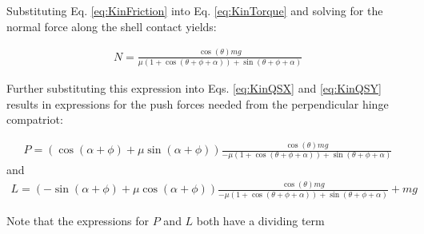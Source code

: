 \documentclass[letterpaper]{report}
\begin{document}
Substituting Eq. \ref{eq:KinFriction} into Eq. \ref{eq:KinTorque} and solving for the normal force along the shell contact yields:

\begin{align}
N = \frac{\cos(\theta) m g}{\mu (1+\cos(\theta + \phi + \alpha)) + \sin(\theta + \phi + \alpha)}
\end{align}

Further substituting this expression into Eqs. \ref{eq:KinQSX} and \ref{eq:KinQSY} results in expressions for the push forces needed from the perpendicular hinge compatriot:

\begin{align}
P = ( \cos(\alpha+\phi) + \mu \sin(\alpha+\phi) ) \frac{\cos(\theta) m g}{-\mu (1+\cos(\theta + \phi + \alpha)) + \sin(\theta + \phi + \alpha)}
\end{align}
and
\begin{align}
L = ( -\sin(\alpha+\phi) + \mu \cos(\alpha+\phi) ) \frac{\cos(\theta) m g}{-\mu (1+\cos(\theta + \phi + \alpha)) + \sin(\theta + \phi + \alpha)} + mg
\end{align}

Note that the expressions for $P$ and $L$ both have a dividing term
\end{document}
